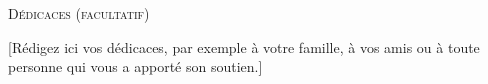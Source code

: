 \begin{titlepage}


\begin{center}
    \textsc{\Huge Dédicaces (facultatif)}\\[2cm]
\end{center}

\large
[Rédigez ici vos dédicaces, par exemple à votre famille, à vos amis ou à toute personne qui vous a apporté son soutien.]

\vfill

\end{titlepage}
\restoregeometry
